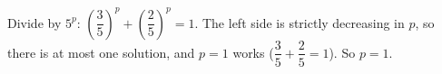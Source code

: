 Divide by $5^p$: $\left(\dfrac{3}{5}\right)^p+\left(\dfrac{2}{5}\right)^p=1$. The left side is strictly decreasing in $p$, so there is at most one solution, and $p=1$ works ($\dfrac{3}{5}+\dfrac{2}{5}=1$). So $\boxed{p=1}$.
